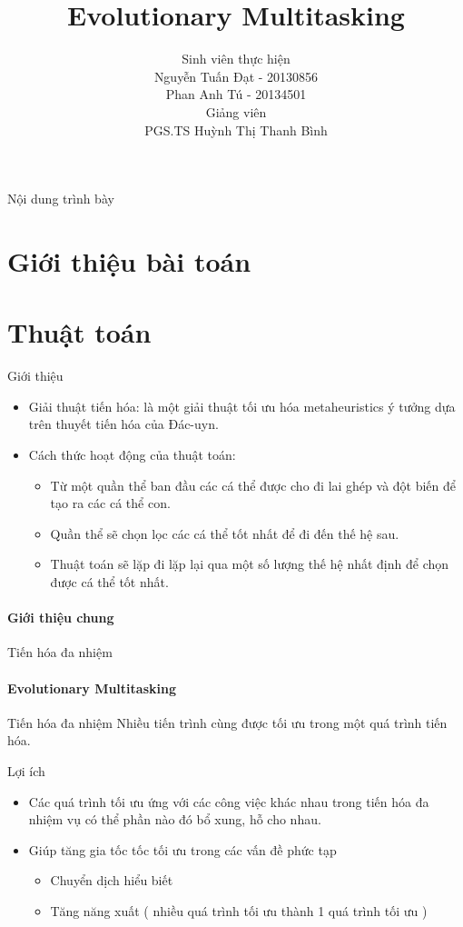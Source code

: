 \documentclass[compress]{beamer}
\title[Evolutionary Multitasking]{Evolutionary Multitasking}
\author[Nguyễn Tuấn Đạt, Phan Anh Tú (SoICT-HUST)]{
Sinh viên thực hiện\\
Nguyễn Tuấn Đạt - 20130856 \\
Phan Anh Tú - 20134501 \\[0.4cm]
Giảng viên \\
PGS.TS Huỳnh Thị Thanh Bình
}
\begin{document}
\begin{frame}
\titlepage
\end{frame}

\begin{frame}{Nội dung trình bày}
\tableofcontents
\end{frame}

\section{Giới thiệu bài toán}

\section{Thuật toán}
\begin{frame}{Giới thiệu}
\begin{itemize}
\item Giải thuật tiến hóa: là một giải thuật tối ưu hóa metaheuristics ý tưởng dựa trên thuyết tiến hóa của Đác-uyn.
\pause
\item Cách thức hoạt động của thuật toán:
\pause
\begin{itemize}
\item Từ một quần thể ban đầu các cá thể được cho đi lai ghép và đột biến để tạo ra các cá thể con.
\item Quần thể sẽ chọn lọc các cá thể tốt nhất để đi đến thế hệ sau.
\item Thuật toán sẽ lặp đi lặp lại qua một số lượng thế hệ nhất định để chọn được cá thể tốt nhất.
\end{itemize}
\end{itemize}
\framesubtitle{Giới thiệu chung}
\end{frame}
\begin{frame}{Tiến hóa đa nhiệm}
\framesubtitle{Evolutionary Multitasking}
\begin{block}{Tiến hóa đa nhiệm}
Nhiều tiến trình cùng được tối ưu trong một quá trình tiến hóa.
\end{block}
\pause
\begin{block}{Lợi ích}
\begin{itemize}
\item Các quá trình tối ưu ứng với các công việc khác nhau trong tiến hóa đa nhiệm vụ có thể phần nào đó bổ xung, hỗ cho nhau.
\item Giúp tăng gia tốc tốc tối ưu trong các vấn đề phức tạp
\begin{itemize}
\item Chuyển dịch hiểu biết
\item Tăng năng xuất ( nhiều quá trình tối ưu thành 1 quá trình tối ưu )
\end{itemize}
\end{itemize}
\end{block}

\end{frame}
\end{document}
